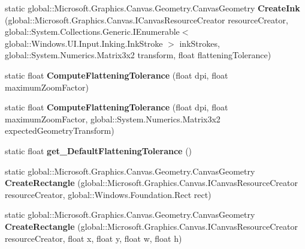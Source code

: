 \begin{DoxyCompactItemize}
static global\+::\+Microsoft.\+Graphics.\+Canvas.\+Geometry.\+Canvas\+Geometry {\bfseries Create\+Ink} (global\+::\+Microsoft.\+Graphics.\+Canvas.\+I\+Canvas\+Resource\+Creator resource\+Creator, global\+::\+System.\+Collections.\+Generic.\+I\+Enumerable$<$ global\+::\+Windows.\+U\+I.\+Input.\+Inking.\+Ink\+Stroke $>$ ink\+Strokes, global\+::\+System.\+Numerics.\+Matrix3x2 transform, float flattening\+Tolerance)
\item 
\mbox{\label{class_microsoft_1_1_graphics_1_1_canvas_1_1_geometry_1_1_canvas_geometry_af0a58e1e6450e34081143a65770bb043}} 
static float {\bfseries Compute\+Flattening\+Tolerance} (float dpi, float maximum\+Zoom\+Factor)
\item 
\mbox{\label{class_microsoft_1_1_graphics_1_1_canvas_1_1_geometry_1_1_canvas_geometry_a4cab7234385475a4109d2dcdca24ca39}} 
static float {\bfseries Compute\+Flattening\+Tolerance} (float dpi, float maximum\+Zoom\+Factor, global\+::\+System.\+Numerics.\+Matrix3x2 expected\+Geometry\+Transform)
\item 
\mbox{\label{class_microsoft_1_1_graphics_1_1_canvas_1_1_geometry_1_1_canvas_geometry_aec4a5123b972fd4576fdd3ab85f59718}} 
static float {\bfseries get\+\_\+\+Default\+Flattening\+Tolerance} ()
\item 
\mbox{\label{class_microsoft_1_1_graphics_1_1_canvas_1_1_geometry_1_1_canvas_geometry_a660756502ddaec1e43624023d23a5c60}} 
static global\+::\+Microsoft.\+Graphics.\+Canvas.\+Geometry.\+Canvas\+Geometry {\bfseries Create\+Rectangle} (global\+::\+Microsoft.\+Graphics.\+Canvas.\+I\+Canvas\+Resource\+Creator resource\+Creator, global\+::\+Windows.\+Foundation.\+Rect rect)
\item 
\mbox{\label{class_microsoft_1_1_graphics_1_1_canvas_1_1_geometry_1_1_canvas_geometry_a09f20f98661ef071c60ef36ee6e9c383}} 
static global\+::\+Microsoft.\+Graphics.\+Canvas.\+Geometry.\+Canvas\+Geometry {\bfseries Create\+Rectangle} (global\+::\+Microsoft.\+Graphics.\+Canvas.\+I\+Canvas\+Resource\+Creator resource\+Creator, float x, float y, float w, float h)

\end{DoxyCompactItemize}
